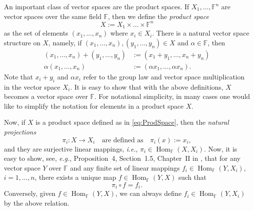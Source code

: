 \documentclass[a4paper]{paper}
\newcommand{\Field}{\mathbb{F}}
\DeclareMathOperator{\Hom}{Hom}
\newcommand{\ie}{\textsl{i.e.}\xspace}
\newcommand{\eg}{\textsl{e.g.}\xspace}
\newcommand{\etc}{\textsl{e.t.c.}\xspace}
\newcommand{\vf}{\boldsymbol{f}}
\begin{document}
An important class of vector spaces are the product spaces. 
If $X_1, \ldots, \Field^{n}$ are  vector spaces over the same field $\Field$, then we
define the \emph{product space}
\begin{equation}\label{eq:ProdSpace}
   X:= X_1 \times \ldots  \times \Field^{n} 
\end{equation}
as the set of elements $(x_1,\ldots,x_{n})$ where $x_i\in X_i$. There is a natural vector 
space structure on $X$, namely, if $(x_1,\ldots,x_{n}), (y_1,\ldots,y_{n})\in X$ and 
$\alpha\in\Field$, then 
\begin{align*}
   (x_1,\ldots,x_{n})+(y_1,\ldots,y_{n}) &:= (x_1+y_1,\ldots,x_{n}+y_{n}) \\
   \alpha (x_1,\ldots,x_{n}) &:= (\alpha x_1,\ldots,\alpha x_{n}).
\end{align*}
Note that $x_i+y_i$ and $\alpha x_i$ refer to the group law and vector space 
multiplication in the vector space $X_i$. It is easy to show that with the above definitions, 
$X$ becomes a vector space over $\Field$. 
For notational simplicity, in many cases one would like to simplify the notation for
elements in a product space $X$. 

Now, if $X$ is a product space defined as in \eqref{eq:ProdSpace}, then the 
\emph{natural projections}
\[ \pi_i \colon X \to X_i \quad\text{are defined as}\quad \pi_i(x):=x_i, \]
and they are surjective linear mappings, \ie, $\pi_i\in\Hom_{\Field}(X,X_i)$. 
Now, it is easy to show, see, \eg, Proposition~4, Section~1.5, Chapter~II in \cite{Bo89}, 
that for any vector space $Y$ over $\Field$ and any finite set of linear mappings 
$f_i \in \Hom_{\Field}(Y,X_i)$,  $i=1,\ldots,n$, there exists a unique map 
$f\in \Hom_{\Field}(Y,X)$ such that 
\[ \pi_i \circ f = f_i. \]
Conversely, given $f\in \Hom_{\Field}(Y,X)$, we can always define $f_i \in \Hom_{\Field}(Y,X_i)$ by 
the above relation. 
\end{document}
